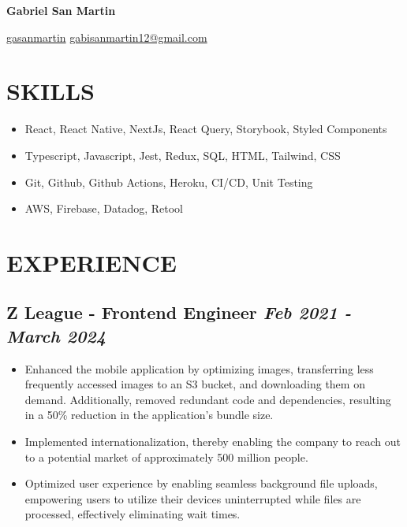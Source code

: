 \documentclass[10pt, a4paper]{article}
\begin{document}
\begin{center}
    \textbf{\Huge Gabriel San Martin} \\ \vspace{3pt}

    \small
    \faLinkedin \hspace{.5pt} \href{https://www.linkedin.com/in/gasanmartin}{gasanmartin}
    \vline \hspace{.5pt}
    \faEnvelope \hspace{.5pt} \href{mailto:gabisanmartin12@gmail.com}{gabisanmartin12@gmail.com}
\end{center}

\section{SKILLS}

\begin{itemize}
    \setlength\itemsep{0em}
    \item React, React Native, NextJs, React Query, Storybook, Styled Components
    \item Typescript, Javascript, Jest, Redux, SQL, HTML, Tailwind, CSS
    \item Git, Github, Github Actions, Heroku, CI/CD, Unit Testing
    \item AWS, Firebase, Datadog, Retool
\end{itemize}

\section{EXPERIENCE}

\subsection*{Z League - Frontend Engineer \hfill \small \textit{Feb 2021 - March 2024}}

\begin{itemize}
    \setlength\itemsep{0em}
    \item Enhanced the mobile application by optimizing images, transferring less frequently accessed images to an S3 bucket, and downloading them on demand. Additionally, removed redundant code and dependencies, resulting in a 50\% reduction in the application's bundle size.
    \item Implemented internationalization, thereby enabling the company to reach out to a potential market of approximately 500 million people.
    \item Optimized user experience by enabling seamless background file uploads, empowering users to utilize their devices uninterrupted while files are processed, effectively eliminating wait times.
\end{itemize}
\end{document}
